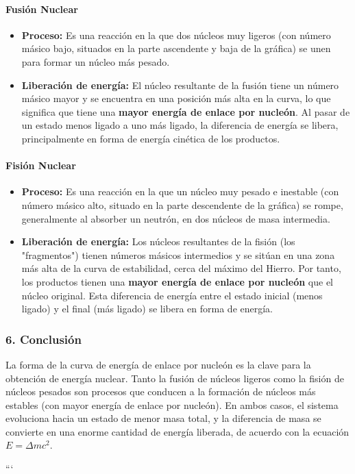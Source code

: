 \paragraph*{Fusión Nuclear}
\begin{itemize}
    \item \textbf{Proceso:} Es una reacción en la que dos núcleos muy ligeros (con número másico bajo, situados en la parte ascendente y baja de la gráfica) se unen para formar un núcleo más pesado.
    \item \textbf{Liberación de energía:} El núcleo resultante de la fusión tiene un número másico mayor y se encuentra en una posición más alta en la curva, lo que significa que tiene una \textbf{mayor energía de enlace por nucleón}. Al pasar de un estado menos ligado a uno más ligado, la diferencia de energía se libera, principalmente en forma de energía cinética de los productos.
\end{itemize}

\paragraph*{Fisión Nuclear}
\begin{itemize}
    \item \textbf{Proceso:} Es una reacción en la que un núcleo muy pesado e inestable (con número másico alto, situado en la parte descendente de la gráfica) se rompe, generalmente al absorber un neutrón, en dos núcleos de masa intermedia.
    \item \textbf{Liberación de energía:} Los núcleos resultantes de la fisión (los "fragmentos") tienen números másicos intermedios y se sitúan en una zona más alta de la curva de estabilidad, cerca del máximo del Hierro. Por tanto, los productos tienen una \textbf{mayor energía de enlace por nucleón} que el núcleo original. Esta diferencia de energía entre el estado inicial (menos ligado) y el final (más ligado) se libera en forma de energía.
\end{itemize}

\subsubsection*{6. Conclusión}
\begin{cajaconclusion}
La forma de la curva de energía de enlace por nucleón es la clave para la obtención de energía nuclear. Tanto la fusión de núcleos ligeros como la fisión de núcleos pesados son procesos que conducen a la formación de núcleos más estables (con mayor energía de enlace por nucleón). En ambos casos, el sistema evoluciona hacia un estado de menor masa total, y la diferencia de masa se convierte en una enorme cantidad de energía liberada, de acuerdo con la ecuación $E = \Delta m c^2$.
\end{cajaconclusion}

\newpage
```